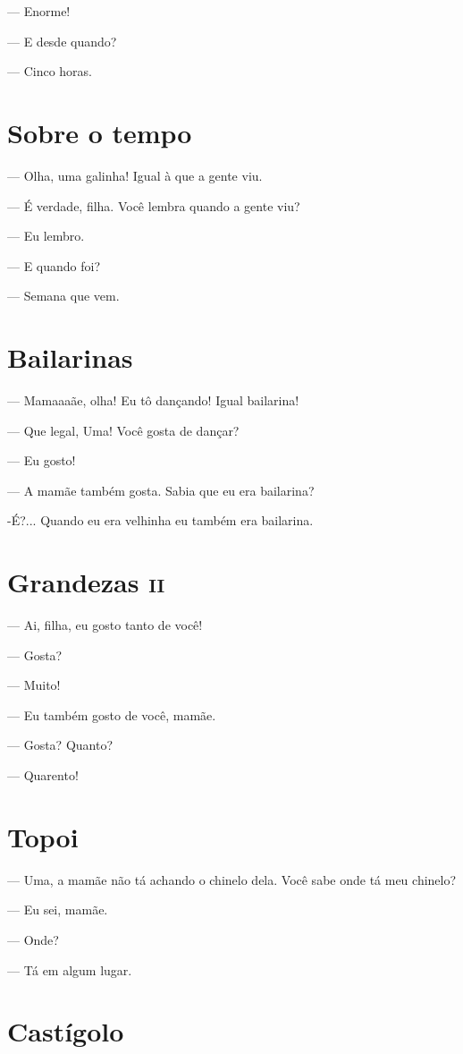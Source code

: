 — Enorme!

— E desde quando?

— Cinco horas.

\chapter{Sobre o tempo}

— Olha, uma galinha! Igual à que a gente viu.

— É verdade, filha. Você lembra quando a gente viu?

— Eu lembro.

— E quando foi?

— Semana que vem.

\chapter{Bailarinas}

— Mamaaaãe, olha! Eu tô dançando! Igual bailarina!

— Que legal, Uma! Você gosta de dançar?

— Eu gosto!

— A mamãe também gosta. Sabia que eu era bailarina?

-É?... Quando eu era velhinha eu também era bailarina.

\chapter{Grandezas \textsc{ii}}

— Ai, filha, eu gosto tanto de você!

— Gosta?

— Muito!

— Eu também gosto de você, mamãe.

— Gosta? Quanto?

— Quarento!

\chapter{Topoi}

— Uma, a mamãe não tá achando o chinelo dela. Você sabe onde tá meu
chinelo?

— Eu sei, mamãe.

— Onde?

— Tá em algum lugar.

\chapter{Castígolo}

